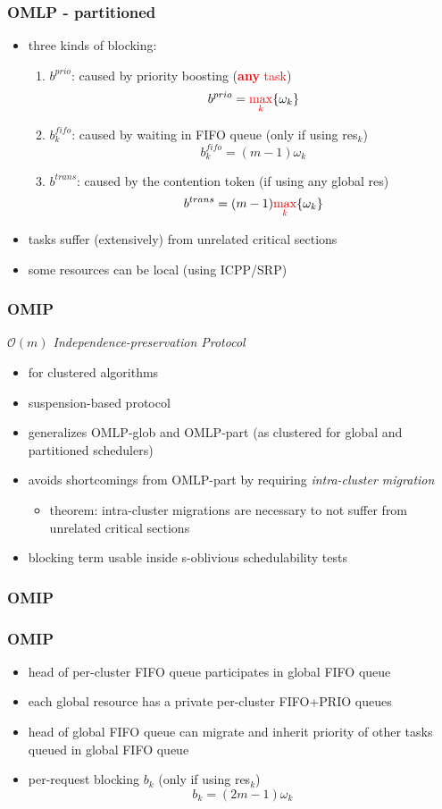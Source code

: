 \documentclass{beamer}
\begin{document}
\begin{frame}
\frametitle{OMLP - partitioned}
\begin{itemize}
\item three kinds of blocking:
  \begin{enumerate}
  \item $b^{prio}$: caused by priority boosting (\textcolor{red}{\textbf{any} task}) \[b^{prio}=\textcolor{red}{\max_k}\{\omega_k\}\]
  \item $b_k^{fifo}$: caused by waiting in FIFO queue (only if using res$_k$) \[b_k^{fifo}=(m-1)\omega_k\]
  \item $b^{trans}$: caused by the contention token (if using any global res) \[b^{trans}=(m-1)\textcolor{red}{\max_k}\{\omega_k\}\]
  \end{enumerate}
\item tasks suffer (extensively) from unrelated critical sections
\item some resources can be local (using ICPP/SRP)
\end{itemize}
\end{frame}

\begin{frame}
\frametitle{OMIP}
\emph{$\mathcal{O}(m)$ Independence-preservation Protocol}
\begin{itemize}
\item for clustered algorithms
\item suspension-based protocol
\item generalizes OMLP-glob and OMLP-part (as clustered for global and partitioned schedulers)
\item avoids shortcomings from OMLP-part by requiring \emph{intra-cluster migration}
  \begin{itemize}
  \item theorem: intra-cluster migrations are necessary to not suffer from unrelated critical sections
  \end{itemize}
\item blocking term usable inside s-oblivious schedulability tests
\end{itemize}
\end{frame}

\begin{frame}
\frametitle{OMIP}
\centerline{}
\end{frame}

\begin{frame}
\frametitle{OMIP}
\begin{itemize}
\item head of per-cluster FIFO queue participates in global FIFO queue
\item each global resource has a private per-cluster FIFO+PRIO queues
\item head of global FIFO queue can migrate and inherit priority of other tasks queued in global FIFO queue
\item per-request blocking $b_k$ (only if using res$_k$) \[b_k = (2m-1)\omega_k\]
\end{itemize}
\end{frame}
\end{document}
